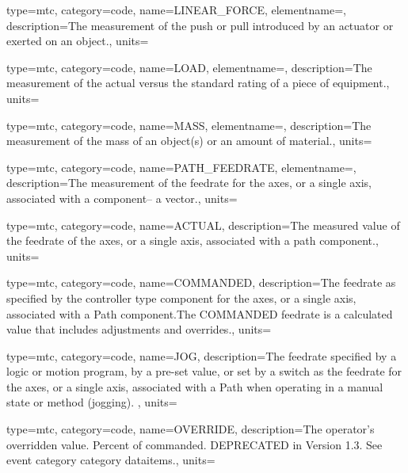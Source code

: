 {
  type=mtc,
  category=code,
  name={LINEAR\_FORCE},
  elementname=,
  description={The measurement of the push or pull introduced by an actuator or exerted on an object.},
  units=
}

{
  type=mtc,
  category=code,
  name={LOAD},
  elementname=,
  description={The measurement of the actual versus the standard rating of a piece of equipment.},
  units=
}

{
  type=mtc,
  category=code,
  name={MASS},
  elementname=,
  description={The measurement of the mass of an object(s) or an amount of material.},
  units=
}

{
  type=mtc,
  category=code,
  name={PATH\_FEEDRATE},
  elementname=,
  description={The measurement of the feedrate for the axes, or a single axis, associated with a  component– a vector.},
  units=
}

{
  type=mtc,
  category=code,
  name={ACTUAL},
  description={The measured value of the feedrate of the axes, or a single axis, associated with a path component.},
  units=
}

{
  type=mtc,
  category=code,
  name={COMMANDED},
  description={The feedrate as specified by the \gls{controller} type component for the axes, or a single axis, associated with a Path component.The COMMANDED feedrate is a calculated value that includes adjustments and overrides.},
  units=
}

{
  type=mtc,
  category=code,
  name={JOG},
  description={The feedrate specified by a logic or motion program, by a pre-set value, or set by a switch as the feedrate for the axes, or a single axis, associated with a Path when operating in a manual state or method (jogging).  },
  units=
}

{
  type=mtc,
  category=code,
  name={OVERRIDE},
  description={The operator’s overridden value.  Percent of commanded. DEPRECATED in Version 1.3.   See \gls{event category} category \glspl{dataitem}.},
  units=
}

